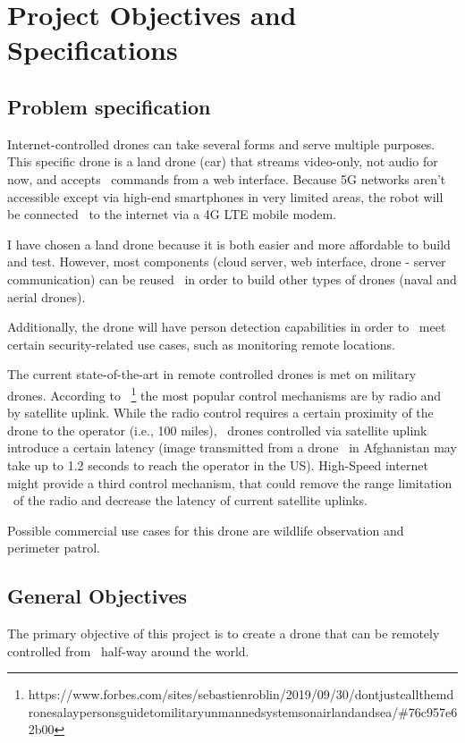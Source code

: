 
\chapter{Project Objectives and Specifications}
\label{ch:specification}

\section{Problem specification}
\label{sec:specification-specification}

Internet-controlled drones can take several forms and serve multiple purposes.
This specific drone is a land drone (car) that streams video-only, not audio for now, and accepts \
commands from a web interface.
Because 5G networks aren't accessible except via high-end smartphones in very limited areas, the robot will be connected \
to the internet via a 4G LTE mobile modem.

I have chosen a land drone because it is both easier and more affordable to build and test.
However, most components (cloud server, web interface, drone - server communication) can be reused \
in order to build other types of drones (naval and aerial drones).

Additionally, the drone will have person detection capabilities in order to \
meet certain security-related use cases, such as monitoring remote locations.

The current state-of-the-art in remote controlled drones is met on military drones.
According to \
\footnote{https://www.forbes.com/sites/sebastienroblin/2019/09/30/dont\-just\-call\-them\-drones\-a\-laypersons\-guide\-to\-military\-unmanned\-systems\-on\-air\-land\-and\-sea/\#76c957e62b00}
the most popular control mechanisms are by radio and by satellite uplink.
While the radio control requires a certain proximity of the drone to the operator (i.e., 100 miles), \
drones controlled via satellite uplink introduce a certain latency (image transmitted from a drone \
in Afghanistan may take up to 1.2 seconds to reach the operator in the US).
High-Speed internet might provide a third control mechanism, that could remove the range limitation \
of the radio and decrease the latency of current satellite uplinks.

Possible commercial use cases for this drone are wildlife observation and perimeter patrol.


\section{General Objectives}
\label{sec:specification-objectives}
The primary objective of this project is to create a drone that can be remotely controlled from \
half-way around the world.

